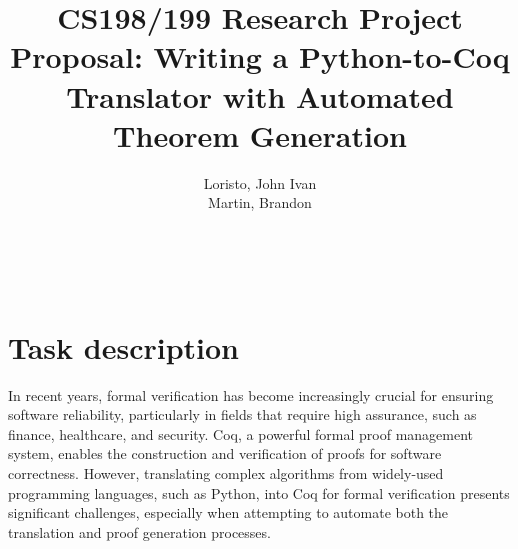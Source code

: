 \documentclass[11pt,A4]{article}
\newcommand{\blue}[1]{\textcolor{RoyalBlue}{#1}}
\newcommand{\instructions}[1]{\blue{\textit{#1}}}
\renewcommand{\instructions}[1]{}
\begin{document}
\title{CS198/199 Research Project Proposal: Writing a Python-to-Coq Translator with Automated Theorem Generation}
\author{Loristo, John Ivan\\Martin, Brandon}

\maketitle 



\instructions{If you are taking CS 198/199 in Logic and Computability Lab, you need to
  either do at least a research project or a literature review.\\
This is a \LaTeX template for the initial proposal for the research project,  but should also give you a start on the final report.\\
The blue pieces of text  in this template are either instructions ({\tt$\backslash$instructions\{...\}}) or indicate where you need to fill in something ({\tt$\backslash$fillme\{...\}}).  
You should replace all the {\tt$\backslash$fillme\{...\}} commands with your own text.
To make the instructions disappear, please uncomment the 
\begin{center}
{\tt$\backslash$renewcommand\{$\backslash$instructions\}[1]\{\}}\\
\end{center}
lines in the preamble (just above  {\tt $\backslash$begin\{document\}} of this .tex file) by removing the leading \% marks, 
recompile (run \LaTeX again) and submit the PDF on Compass.}\\

\section*{Task description}

In recent years, formal verification has become increasingly crucial for ensuring software reliability, particularly in fields that require high assurance, such as finance, healthcare, and security. Coq, a powerful formal proof management system, enables the construction and verification of proofs for software correctness. However, translating complex algorithms from widely-used programming languages, such as Python, into Coq for formal verification presents significant challenges, especially when attempting to automate both the translation and proof generation processes.\par
\end{document}
